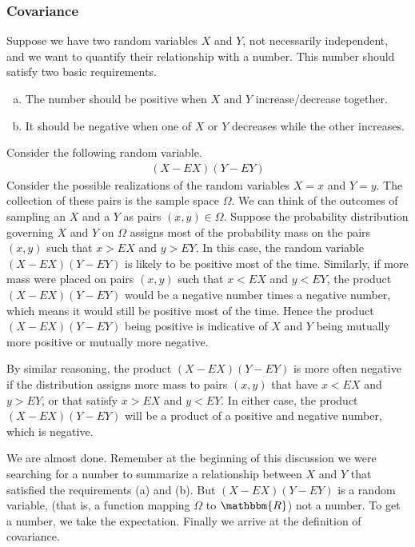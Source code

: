 \documentclass[11pt,letterpaper]{article}
\newcommand\real{\mathbbm{R}}
\numberwithin{theorem}{section}
\numberwithin{definition}{section}
\numberwithin{lemma}{section}
\numberwithin{corollary}{section}
\numberwithin{proposition}{section}
\theoremstyle{definition}
\numberwithin{remark}{section}
\numberwithin{claim}{section}
\numberwithin{observation}{section}
\numberwithin{fact}{section}
\numberwithin{assumption}{section}
\numberwithin{example}{section}
\numberwithin{exercise}{section}
\begin{document}
\subsubsection{Covariance}
Suppose we have two random variables $X$ and $Y$, not necessarily independent, and we want to quantify their relationship with a number. This number should satisfy two basic requirements.

\begin{enumerate}[(a)]
\item The number should be positive when $X$ and $Y$ increase/decrease together.

\item It should be negative when one of $X$ or $Y$ decreases while the other increases.
\end{enumerate}
Consider the following random variable.
\begin{align*}
(X - EX) (Y - EY)
\end{align*}
Consider the possible realizations of the random variables $X = x$ and $Y = y$. The collection of these pairs is the sample space $\Omega$. We can think of the outcomes of sampling an $X$ and a $Y$ as pairs $(x,y) \in \Omega$. Suppose the probability distribution governing $X$ and $Y$ on $\Omega$ assigns most of the probability mass on the pairs $(x,y)$ such that $x > EX$ and $y > EY$. In this case, the random variable $(X - EX)(Y-EY)$ is likely to be positive most of the time. Similarly, if more mass were placed on pairs $(x,y)$ such that $x < EX$ and $y < EY$, the product $(X - EX)(Y - EY)$ would be a negative number times a negative number, which means it would still be positive most of the time. Hence the product $(X - EX)(Y - EY)$ being positive is indicative of $X$ and $Y$ being mutually more positive or mutually more negative. 

By similar reasoning, the product $(X - EX)(Y - EY)$ is more often negative if the distribution assigns more mass to pairs $(x,y)$ that have $x < EX$ and $y > EY$, or that satisfy $x > EX$ and $y < EY$. In either case, the product $(X-EX)(Y - EY)$ will be a product of a positive and negative number, which is negative. 

We are almost done. Remember at the beginning of this discussion we were searching for a number to summarize a relationship between $X$ and $Y$ that satisfied the requirements (a) and (b). But $(X-EX)(Y-EY)$ is a random variable, (that is, a function mapping $\Omega$ to $\real$) not a number. To get a number, we take the expectation. Finally we arrive at the definition of covariance.
\end{document}

